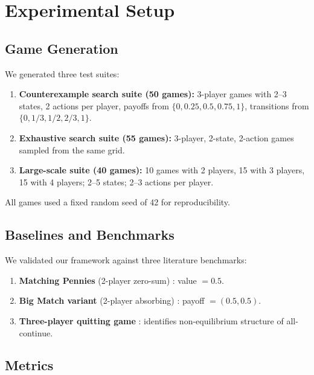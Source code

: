 \documentclass[11pt,a4paper]{article}
\theoremstyle{definition}
\begin{document}
\section{Experimental Setup}\label{sec:setup}

\subsection{Game Generation}

We generated three test suites:

\begin{enumerate}[leftmargin=1.5em]
    \item \textbf{Counterexample search suite (50 games):} 3-player games with 2--3 states, 2 actions per player, payoffs from $\{0, 0.25, 0.5, 0.75, 1\}$, transitions from $\{0, 1/3, 1/2, 2/3, 1\}$.
    \item \textbf{Exhaustive search suite (55 games):} 3-player, 2-state, 2-action games sampled from the same grid.
    \item \textbf{Large-scale suite (40 games):} 10 games with 2 players, 15 with 3 players, 15 with 4 players; 2--5 states; 2--3 actions per player.
\end{enumerate}

All games used a fixed random seed of 42 for reproducibility.

\subsection{Baselines and Benchmarks}

We validated our framework against three literature benchmarks:
\begin{enumerate}[leftmargin=1.5em]
    \item \textbf{Matching Pennies} (2-player zero-sum) \citep{shapley1953stochastic,mertens1981stochastic}: value $= 0.5$.
    \item \textbf{Big Match variant} (2-player absorbing) \citep{blackwell1968big,vieille2000a}: payoff $= (0.5, 0.5)$.
    \item \textbf{Three-player quitting game} \citep{solan1999three,flesch1997cyclic}: identifies non-equilibrium structure of all-continue.
\end{enumerate}

\subsection{Metrics}
\end{document}
